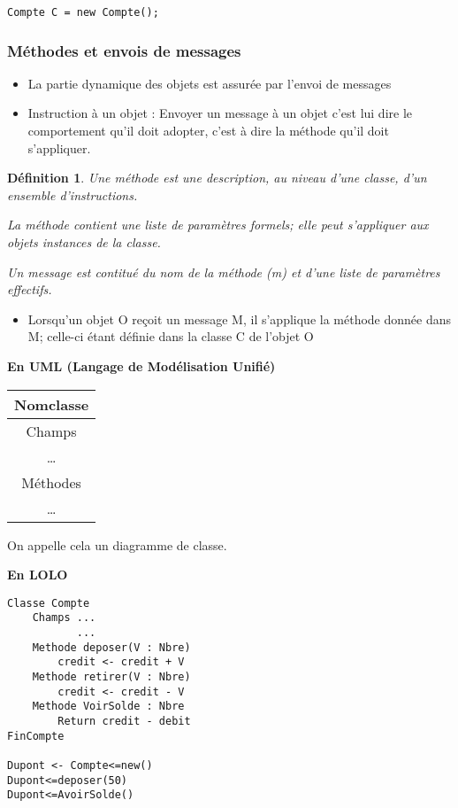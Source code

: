 \documentclass{article}
\newtheorem{definition}{Définition}
\begin{document}
\begin{verbatim}
Compte C = new Compte();
\end{verbatim}

\subsubsection{Méthodes et envois de messages}

\begin{itemize}
	\item La partie dynamique des objets est assurée par l'envoi 
		de messages
	\item Instruction à un objet : Envoyer un message à un objet 
		c'est lui dire le comportement qu'il doit adopter, 
		c'est à dire la méthode qu'il doit s'appliquer.
\end{itemize}

\begin{definition}
	Une méthode est une description, au niveau d'une classe, 
	d'un ensemble d'instructions.

	La méthode contient une liste de paramètres formels; 
	elle peut s'appliquer aux objets instances de la classe.

	Un message est contitué du nom de la méthode (m) et d'une liste 
	de paramètres effectifs.
\end{definition}

\begin{itemize}
	\item Lorsqu'un objet O reçoit un message M, il s’applique 
		la méthode donnée dans M; celle-ci étant définie dans 
		la classe C de l'objet O
\end{itemize}

\textbf{En UML (Langage de Modélisation Unifié)}

\begin{tabular}{|c|}
	\hline
	Nomclasse \\
	\hline
	Champs \\
	\dots \\
	\hline
	Méthodes \\
	\dots \\
	\hline
\end{tabular}

On appelle cela un diagramme de classe.


\textbf{En LOLO}

\begin{verbatim}
Classe Compte
	Champs ...
		   ... 
	Methode deposer(V : Nbre)
		credit <- credit + V
	Methode retirer(V : Nbre)
		credit <- credit - V
	Methode VoirSolde : Nbre
		Return credit - debit
FinCompte

Dupont <- Compte<=new()
Dupont<=deposer(50)
Dupont<=AvoirSolde()
\end{verbatim}
\end{document}
